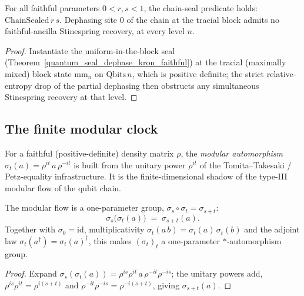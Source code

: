 \begin{theorem}\label{chain_seal_dephase_faithful}
  \leanok
  For all faithful parameters \(0<r,s<1\), the chain-seal predicate holds:
  \(\mathrm{ChainSealed}\,r\,s\). Dephasing site \(0\) of the chain at the tracial block admits no
  faithful-ancilla Stinespring recovery, at every level \(n\).
\end{theorem}
\begin{proof}\leanok
  Instantiate the uniform-in-the-block seal
  (Theorem~\ref{quantum_seal_dephase_kron_faithful}) at the tracial (maximally mixed) block state
  \(\mathrm{mm}_n\) on \(\mathrm{Qbits}\,n\), which is positive definite; the strict relative-entropy
  drop of the partial dephasing then obstructs any simultaneous Stinespring recovery at that level.
\end{proof}

\subsection{The finite modular clock}

\begin{definition}\label{modAut}
  \leanok
  For a faithful (positive-definite) density matrix \(\rho\), the \emph{modular automorphism}
  \(\sigma_t(a)=\rho^{it}\,a\,\rho^{-it}\) is built from the unitary power \(\rho^{it}\) of the
  Tomita--Takesaki / Petz-equality infrastructure. It is the finite-dimensional shadow of the
  type-III modular flow of the qubit chain.
\end{definition}

\begin{theorem}\label{modAut_add}
  \leanok
  The modular flow is a one-parameter group, \(\sigma_s\circ\sigma_t=\sigma_{s+t}\):
  \[
    \sigma_s\bigl(\sigma_t(a)\bigr) \;=\; \sigma_{s+t}(a).
  \]
  Together with \(\sigma_0=\mathrm{id}\), multiplicativity \(\sigma_t(a\,b)=\sigma_t(a)\,\sigma_t(b)\)
  and the adjoint law \(\sigma_t(a^{\dagger})=\sigma_t(a)^{\dagger}\), this makes \((\sigma_t)_t\) a
  one-parameter \(*\)-automorphism group.
\end{theorem}
\begin{proof}\leanok
  Expand \(\sigma_s(\sigma_t(a))=\rho^{is}\rho^{it}\,a\,\rho^{-it}\rho^{-is}\); the unitary powers add,
  \(\rho^{is}\rho^{it}=\rho^{i(s+t)}\) and \(\rho^{-it}\rho^{-is}=\rho^{-i(s+t)}\), giving
  \(\sigma_{s+t}(a)\).
\end{proof}

